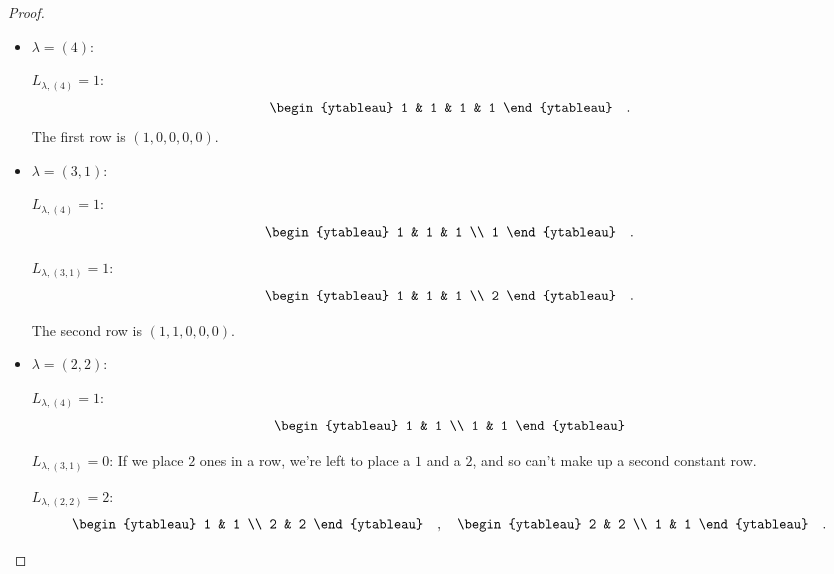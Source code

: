 \documentclass[12pt]{extarticle}
\newcommand{\<}{\langle}
\renewcommand{\>}{\rangle}
\theoremstyle{definition}
\begin{document}
\begin{proof}
\begin{enumerate}
    \begin{itemize}
    \item
      $\lambda=(4)$:
      
      $L_{\lambda, (4)} = 1$:
      \begin{align*}
        \begin{ytableau}
          1 & 1 & 1 & 1
        \end{ytableau}\quad.      
      \end{align*}
      The first row is $(1,0,0,0,0)$.
    \item
      $\lambda = (3,1)$:

      $L_{\lambda, (4)} = 1$:
      \begin{align*}
        \begin{ytableau}
          1 & 1 & 1 \\
          1
        \end{ytableau}\quad.      
      \end{align*}      

      $L_{\lambda, (3,1)} = 1$:
      \begin{align*}
        \begin{ytableau}
          1 & 1 & 1 \\
          2
        \end{ytableau}\quad.      
      \end{align*}

      The second row is $(1,1,0,0,0)$.
      
    \item
      $\lambda=(2,2)$:

      $L_{\lambda, (4)} = 1$:
      \begin{align*}
        \begin{ytableau}
          1 & 1 \\
          1 & 1
        \end{ytableau}
      \end{align*}

      $L_{\lambda, (3,1)} = 0$: If we place $2$ ones in a row, we're left to place a $1$ and a $2$, and so can't make up a second constant row. 

      $L_{\lambda, (2,2)} = 2$:
      \begin{align*}
        \begin{ytableau}
          1 & 1 \\
          2 & 2
        \end{ytableau}\quad,\quad
        \begin{ytableau}
          2 & 2 \\
          1 & 1
        \end{ytableau}\quad.              
      \end{align*}
      

\end{itemize}
\end{enumerate}
\end{proof}
\end{document}
